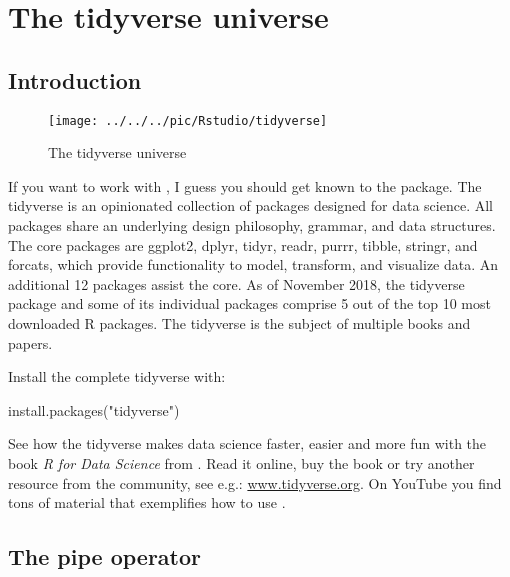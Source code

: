 \chapter{The tidyverse universe}\label{ch:tidyverse}

\section{Introduction}

\begin{figure}[h]
	\centering
	\texttt{[image: ../../../pic/Rstudio/tidyverse]}
	\caption{The tidyverse universe}
	\label{fig:tidyverseuniverse}
\end{figure}

If you want to work with \R, I guess you should get known to the  package. 
The tidyverse is an opinionated collection of \R packages designed for data science. All packages share an underlying design philosophy, grammar, and data structures. 
The core packages are ggplot2, dplyr, tidyr, readr, purrr, tibble, stringr, and forcats, which provide functionality to model, transform, and visualize data. An additional 12 packages assist the core. As of November 2018, the tidyverse package and some of its individual packages comprise 5 out of the top 10 most downloaded R packages. The tidyverse is the subject of multiple books and papers.

Install the complete tidyverse with:

\begin{rblock1}
	install.packages("tidyverse")
\end{rblock1}

See how the tidyverse makes data science faster, easier and more fun with the book \textit{R for Data Science} from \cite{Grolemund2018R}. Read it online, buy the book or try another resource from the community, see e.g.: \websmall\url{www.tidyverse.org}.
On YouTube you find tons of material that exemplifies how to use \R. 

\section{The pipe operator}

